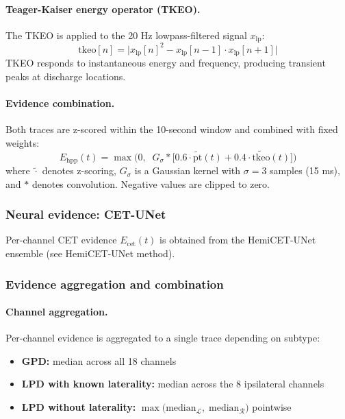 \paragraph{Teager-Kaiser energy operator (TKEO).}
The TKEO is applied to the 20 Hz lowpass-filtered signal $x_{\mathrm{lp}}$:
\[ \mathrm{tkeo}[n] = \big|x_{\mathrm{lp}}[n]^2 - x_{\mathrm{lp}}[n-1] \cdot x_{\mathrm{lp}}[n+1]\big| \tag{4} \]
TKEO responds to instantaneous energy and frequency, producing transient peaks at discharge locations.

\paragraph{Evidence combination.}
Both traces are z-scored within the 10-second window and combined with fixed weights:
\[ E_{\mathrm{hpp}}(t) = \max\!\Big(0,\;\; G_{\sigma} * \big[0.6 \cdot \tilde{\mathrm{pt}}(t) + 0.4 \cdot \widetilde{\mathrm{tkeo}}(t)\big]\Big) \tag{5} \]
where $\tilde{\cdot}$ denotes z-scoring, $G_{\sigma}$ is a Gaussian kernel with $\sigma = 3$ samples (15 ms), and $*$ denotes convolution. Negative values are clipped to zero.

\subsubsection{Neural evidence: CET-UNet}

Per-channel CET evidence $E_{\mathrm{cet}}(t)$ is obtained from the HemiCET-UNet ensemble (see HemiCET-UNet method).

\subsubsection{Evidence aggregation and combination}

\paragraph{Channel aggregation.}
Per-channel evidence is aggregated to a single trace depending on subtype:
\begin{itemize}
  \item \textbf{GPD:} median across all 18 channels
  \item \textbf{LPD with known laterality:} median across the 8 ipsilateral channels
  \item \textbf{LPD without laterality:} $\max\!\big(\mathrm{median}_{\mathcal{L}},\; \mathrm{median}_{\mathcal{R}}\big)$ pointwise
\end{itemize}

